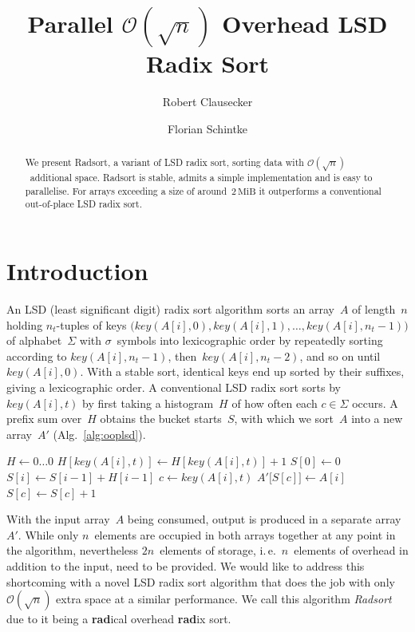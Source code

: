 \documentclass[nolineno,a4paper,UKenglish,cleveref, autoref, thm-restate]{socg-lipics-v2021}
\title{Parallel $\mathcal O(\sqrt{n})$ Overhead LSD Radix Sort}
\author{Robert Clausecker}{Zuse Institute Berlin, Germany}{clausecker@zib.de}{}{NHR-Verein Graduate School programme}
\author{Florian Schintke}{Zuse Institute Berlin, Germany}{schintke@zib.de}{https://orcid.org/0000-0003-4548-788X}{}
\def\key{\textit{key}}
\begin{document}
\maketitle

\begin{abstract}
We present
Radsort, a variant of LSD radix sort, sorting data with $\mathcal O(\sqrt{n})$~additional space.
Radsort is stable, admits a simple implementation and is easy to parallelise.
For arrays exceeding a size of around~$2\,\mathrm{MiB}$ it outperforms a conventional
out-of-place LSD radix sort.
\end{abstract}

\section{Introduction}
An LSD (least significant digit) radix sort algorithm sorts an array~$A$ of
length~$n$ holding $n_t$-tuples of keys $\bigl(\key(A[i],0),\key(A[i],1),\ldots,\key(A[i],n_t-1)\bigr)$
of alphabet~$\Sigma$ with $\sigma$~symbols into lexicographic order
by repeatedly sorting according to $\key(A[i],n_t-1)$,
then~$\key(A[i],n_t-2)$, and so on until~$\key(A[i],0)$.
With a stable sort, identical keys end up sorted by their suffixes,
giving a lexicographic order.
A conventional LSD radix sort sorts by~$\key(A[i],t)$ by first taking a histogram~$H$
of how often each $c\in\Sigma$ occurs.  A prefix sum over~$H$ obtains
the bucket starts~$S$, with which we sort~$A$ into a new array~$A'$
(Alg.~\ref{alg:ooplsd}).

\begin{algorithm}
\caption{out-of-place LSD radix sort round}\label{alg:ooplsd}
\begin{algorithmic}[1]
\State $H\gets 0\ldots 0$
\Comment{take a histogram of $\key(A[i],t)$}
 \State$H[\key(A[i],t)]\gets H[\key(A[i],t)]+1$
\EndFor
\State $S[0] \gets 0$
 \State$S[i]\gets S[i-1]+H[i-1]$
\EndFor
{}
 \State$c\gets\key(A[i],t)$
 \State$A'\bigl[S[c]\bigr]\gets A[i]$
 \State$S[c]\gets S[c]+1$
\EndFor
\EndProcedure
\end{algorithmic}
\end{algorithm}

\goodbreak

With the input array~$A$ being consumed, output is produced in a separate array~$A'$.
While only $n$~elements
are occupied in both arrays together at any point in the algorithm, nevertheless
$2n$~elements of storage, i.\,e.~$n$~elements of overhead in addition to the input,
need to be provided.
We would like to address this shortcoming with a novel LSD radix sort algorithm
that does the job with only $\mathcal O(\sqrt n)$ extra space at a similar performance.
We call this algorithm \emph{Radsort} due to it being
a \textbf{rad}ical overhead \textbf{rad}ix sort.
\end{document}
